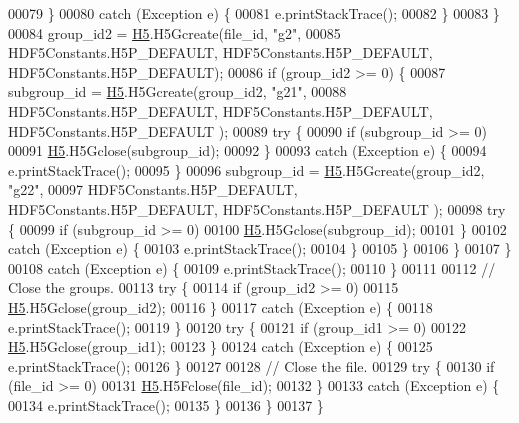 \begin{DoxyCode}
00079                     \}
00080                     \textcolor{keywordflow}{catch} (Exception e) \{
00081                         e.printStackTrace();
00082                     \}
00083                 \}
00084                 group\_id2 = \hyperlink{namespace_h5}{H5}.H5Gcreate(file\_id, \textcolor{stringliteral}{"g2"},
00085                         HDF5Constants.H5P\_DEFAULT, HDF5Constants.H5P\_DEFAULT, HDF5Constants.H5P\_DEFAULT);
00086                 \textcolor{keywordflow}{if} (group\_id2 >= 0) \{
00087                     subgroup\_id = \hyperlink{namespace_h5}{H5}.H5Gcreate(group\_id2, \textcolor{stringliteral}{"g21"},
00088                             HDF5Constants.H5P\_DEFAULT, HDF5Constants.H5P\_DEFAULT, HDF5Constants.H5P\_DEFAULT
      );
00089                     \textcolor{keywordflow}{try} \{
00090                         \textcolor{keywordflow}{if} (subgroup\_id >= 0)
00091                             \hyperlink{namespace_h5}{H5}.H5Gclose(subgroup\_id);
00092                     \}
00093                     \textcolor{keywordflow}{catch} (Exception e) \{
00094                         e.printStackTrace();
00095                     \}
00096                     subgroup\_id = \hyperlink{namespace_h5}{H5}.H5Gcreate(group\_id2, \textcolor{stringliteral}{"g22"},
00097                             HDF5Constants.H5P\_DEFAULT, HDF5Constants.H5P\_DEFAULT, HDF5Constants.H5P\_DEFAULT
      );
00098                     \textcolor{keywordflow}{try} \{
00099                         \textcolor{keywordflow}{if} (subgroup\_id >= 0)
00100                             \hyperlink{namespace_h5}{H5}.H5Gclose(subgroup\_id);
00101                     \}
00102                     \textcolor{keywordflow}{catch} (Exception e) \{
00103                         e.printStackTrace();
00104                     \}
00105                 \}
00106             \}
00107         \}
00108         \textcolor{keywordflow}{catch} (Exception e) \{
00109             e.printStackTrace();
00110         \}
00111 
00112         \textcolor{comment}{// Close the groups.}
00113         \textcolor{keywordflow}{try} \{
00114             \textcolor{keywordflow}{if} (group\_id2 >= 0)
00115                 \hyperlink{namespace_h5}{H5}.H5Gclose(group\_id2);
00116         \}
00117         \textcolor{keywordflow}{catch} (Exception e) \{
00118             e.printStackTrace();
00119         \}
00120         \textcolor{keywordflow}{try} \{
00121             \textcolor{keywordflow}{if} (group\_id1 >= 0)
00122                 \hyperlink{namespace_h5}{H5}.H5Gclose(group\_id1);
00123         \}
00124         \textcolor{keywordflow}{catch} (Exception e) \{
00125             e.printStackTrace();
00126         \}
00127 
00128         \textcolor{comment}{// Close the file.}
00129         \textcolor{keywordflow}{try} \{
00130             \textcolor{keywordflow}{if} (file\_id >= 0)
00131                 \hyperlink{namespace_h5}{H5}.H5Fclose(file\_id);
00132         \}
00133         \textcolor{keywordflow}{catch} (Exception e) \{
00134             e.printStackTrace();
00135         \}
00136     \}
00137 \}
\end{DoxyCode}

